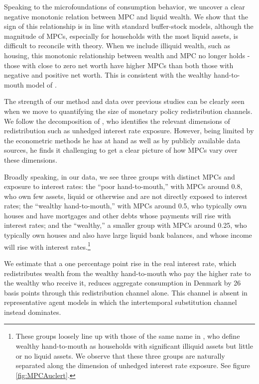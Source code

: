 \documentclass[titlepage]{\econtex}\newcommand{\texname}{ConsumptionHeterogeneity}
\begin{document}
Speaking to the microfoundations of consumption behavior, we uncover a clear negative monotonic relation between MPC and liquid wealth. We show that the sign of this relationship is in line with standard buffer-stock models, although the magnitude of MPCs, especially for households with the most liquid assets, is difficult to reconcile with theory. When we include illiquid wealth, such as housing, this monotonic relationship between wealth and MPC no longer holds - those with close to zero net worth have higher MPCs than both those with negative and positive net worth. This is consistent with the wealthy hand-to-mouth model of \cite{violante_wealthy_2014}.

The strength of our method and data over previous studies can be clearly seen when we move to quantifying the size of monetary policy redistribution channels. We follow the decomposition of \cite{auclert_monetary_2017}, who identifies the relevant dimensions of redistribution such as unhedged interest rate exposure. However, being limited by the econometric methods he has at hand as well as by publicly available data sources, he finds it challenging to get a clear picture of how MPCs vary over these dimensions.

Broadly speaking, in our data, we see three groups with distinct MPCs and exposure to interest rates: the ``poor hand-to-mouth,'' with MPCs around 0.8, who own few assets, liquid or otherwise and are not directly exposed to interest rates; the ``wealthy hand-to-mouth,'' with MPCs around 0.5, who typically own houses and have mortgages and other debts whose payments will rise with interest rates; and the ``wealthy,'' a smaller group with MPCs around 0.25, who typically own houses and also have large liquid bank balances, and whose income will rise with interest rates.\footnote{These groups loosely line up with those of the same name in \cite{violante_wealthy_2014}, who define wealthy hand-to-mouth as households with significant illiquid assets but little or no liquid assets. We observe that these three groups are naturally separated along the dimension of unhedged interest rate exposure. See figure \ref{fig:MPCAuclert}.}

We estimate that a one percentage point rise in the real interest rate, which redistributes wealth from the wealthy hand-to-mouth who pay the higher rate to the wealthy who receive it, reduces aggregate consumption in Denmark by 26 basis points through this redistribution channel alone. This channel is absent in representative agent models in which the intertemporal substitution channel instead dominates.
\end{document}
